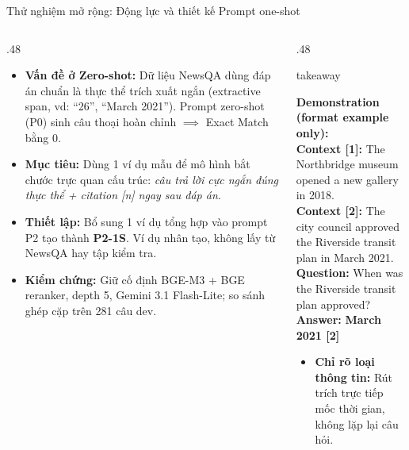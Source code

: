 \begin{frame}[t]{Thử nghiệm mở rộng: Động lực và thiết kế Prompt one-shot}
\begin{columns}[T,onlytextwidth]
\begin{column}{.48\textwidth}
{\fontsize{13.5}{17.5}\selectfont
\begin{itemize}
  \setlength{\itemsep}{1.5pt}
  \item \textbf{Vấn đề ở Zero-shot:} Dữ liệu NewsQA dùng đáp án chuẩn là thực thể trích xuất ngắn (extractive span, vd: ``26'', ``March 2021''). Prompt zero-shot (P0) sinh câu thoại hoàn chỉnh $\implies$ Exact Match bằng 0.
  \item \textbf{Mục tiêu:} Dùng 1 ví dụ mẫu để mô hình bắt chước trực quan cấu trúc: \textit{câu trả lời cực ngắn đúng thực thể + citation [n] ngay sau đáp án}.
  \item \textbf{Thiết lập:} Bổ sung 1 ví dụ tổng hợp vào prompt P2 tạo thành \textbf{P2-1S}. Ví dụ nhân tạo, không lấy từ NewsQA hay tập kiểm tra.
  \item \textbf{Kiểm chứng:} Giữ cố định BGE-M3 + BGE reranker, depth 5, Gemini 3.1 Flash-Lite; so sánh ghép cặp trên 281 câu dev.
\end{itemize}\par}
\end{column}
\begin{column}{.48\textwidth}
\begin{beamercolorbox}[wd=\linewidth,sep=3mm,rounded=true]{takeaway}
{\fontsize{12}{15.5}\selectfont\color{brandink}
\textbf{Demonstration (format example only):}\\[1.5mm]
\textbf{Context [1]:} The Northbridge museum opened a new gallery in 2018.\\
\textbf{Context [2]:} The city council approved the Riverside transit plan in March 2021.\\
\textbf{Question:} When was the Riverside transit plan approved?\\
\textbf{Answer:} \textbf{March 2021 [2]}\par}
\end{beamercolorbox}
\vspace{1.5mm}
{\fontsize{13}{16.5}\selectfont
\begin{itemize}
  \setlength{\itemsep}{1.5pt}
  \item \textbf{Chỉ rõ loại thông tin:} Rút trích trực tiếp mốc thời gian, không lặp lại câu hỏi.

\end{itemize}}
\end{column}
\end{columns}
\end{frame}
